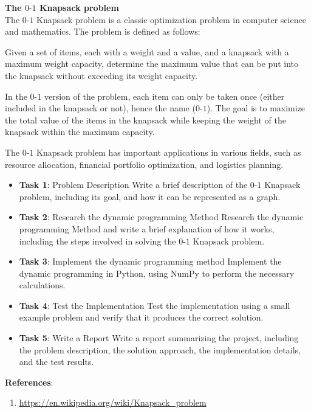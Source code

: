 \question
{\center \bf The $0\text{-}1$ Knapsack problem\\}
The $0\text{-}1$ Knapsack problem is a classic optimization problem in computer
science and mathematics. The problem is defined as follows:

Given a set of items, each with a weight and a value, and a knapsack
with a maximum weight capacity, determine the maximum value that can be
put into the knapsack without exceeding its weight capacity.

In the $0\text{-}1$ version of the problem, each item can only be taken once
(either included in the knapsack or not), hence the name ($0\text{-}1$). The
goal is to maximize the total value of the items in the knapsack while
keeping the weight of the knapsack within the maximum capacity.

The $0\text{-}1$ Knapsack problem has important applications in various fields,
such as resource allocation, financial portfolio optimization, and
logistics planning.

\begin{itemize}
\item
  \textbf{Task 1}: Problem Description Write a brief description of the
  $0\text{-}1$ Knapsack problem, including its goal, and how it can be
  represented as a graph.
\item
  \textbf{Task 2}: Research the dynamic programming Method Research the
  dynamic programming Method and write a brief explanation of how it
  works, including the steps involved in solving the $0\text{-}1$ Knapsack
  problem.
\item
  \textbf{Task 3}: Implement the dynamic programming method Implement
  the dynamic programming in Python, using NumPy to perform the
  necessary calculations.
\item
  \textbf{Task 4}: Test the Implementation Test the implementation using
  a small example problem and verify that it produces the correct
  solution.
\item
  \textbf{Task 5}: Write a Report Write a report summarizing the
  project, including the problem description, the solution approach, the
  implementation details, and the test results.
\end{itemize}

\textbf{References}:

\begin{enumerate}
\def\labelenumi{\arabic{enumi}.}
\item
\href{https://en.wikipedia.org/wiki/Knapsack\_problem}{https://en.wikipedia.org/wiki/Knapsack\_problem}
\end{enumerate}
\newpage